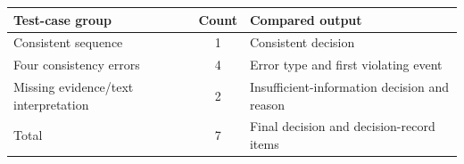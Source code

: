 \begin{table}[t]
\centering
{}
\label{tab:uppaal-fixtures}
\footnotesize
\begin{tabularx}{\columnwidth}{L{0.28\columnwidth}cY}
\toprule
Test-case group & Count & Compared output \\
\midrule
Consistent sequence & 1 & Consistent decision \\
Four consistency errors & 4 & Error type and first violating event \\
Missing evidence/text interpretation & 2 & Insufficient-information decision and reason \\
\midrule
Total & 7 & Final decision and decision-record items \\
\bottomrule
\end{tabularx}
\end{table}
